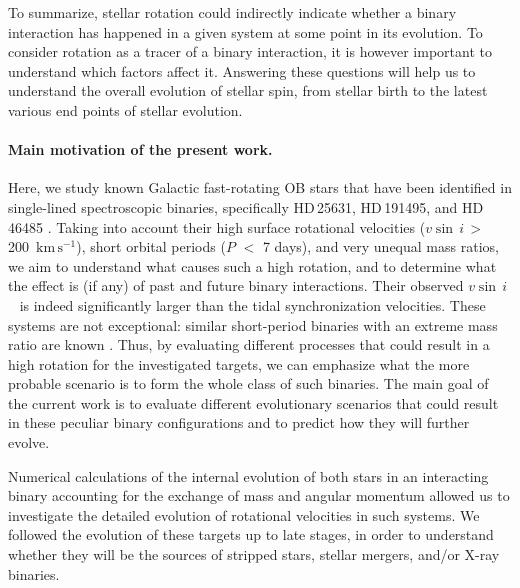 \documentclass{aa}
\newcommand{\kms}{$\mathrm{km\,s^{-1}}$}
\newcommand{\vsini} {$v\sin\,i$}
\DeclareRobustCommand{\Tabref}[1]{Table~\ref{#1}}
\begin{document}
To summarize, stellar rotation could indirectly indicate whether a binary interaction has happened in a given system at some point in its evolution.
To consider rotation as a tracer of a binary interaction, it is however important to understand which factors affect it.
Answering these questions will help us to understand the overall evolution of stellar spin, from stellar birth to the latest various end points of stellar evolution.

\paragraph{Main motivation of the present work.}
Here, we study known Galactic fast-rotating OB stars that have been identified
  in single-lined spectroscopic binaries, specifically HD\,25631,
  HD\,191495, and HD\,46485
  \citep[SB1;][see also \Tabref{table:sb1_fast}]{Britavskiy_2023,Naze_2023_rot}. Taking into account
  their high surface rotational velocities (\vsini\,$>$\,200~\kms), short orbital periods ($P$ $<$ 7 days), and very unequal
  mass ratios, we aim to understand what causes such a high rotation, and to determine what the effect is (if any)
of past and future binary interactions. Their observed \vsini~ is indeed significantly larger than the tidal synchronization velocities.
These systems are not exceptional: similar short-period
binaries with an extreme mass ratio are known \citep[][]{Moe_2015,Jerzykiewicz_2021}. Thus, by evaluating different processes that
could result in a high rotation for the investigated targets, we can
emphasize what  the more probable scenario is to form the whole class of such binaries.
The main goal of the current work is to evaluate different evolutionary scenarios that could result in these peculiar binary configurations and to predict how they will further evolve.


Numerical calculations of the internal evolution of both stars in an
interacting binary accounting for the exchange of mass and angular
momentum \citep[e.g.,][]{wang:20, Badry_2021,Renzo_2021, pauli:22,
  renzo:23} allowed us to investigate the detailed evolution of
rotational velocities in such systems. We followed the evolution of these targets up to late stages, in order to understand whether they will be the sources of stripped stars, stellar mergers, and/or X-ray binaries.
\end{document}
